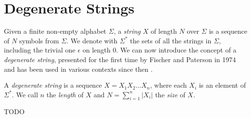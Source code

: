 \section{Degenerate Strings}
Given a finite non-empty alphabet $\Sigma$, a \emph{string} $X$ of length $N$ over $\Sigma$ is a sequence of $N$ symbols from $\Sigma$. We denote with $\Sigma^*$ the sets of all the strings in $\Sigma$, including the trivial one $\epsilon$ on length $0$. We can now introduce the concept of a \emph{degenerate string}, presented for the first time by Fischer and Paterson in 1974 \cite{fischer1974string} and has been used in various contexts since then \cite{alzamel2018degenerate}.

\begin{definition}\label{def:degenerate_string}
    A \emph{degenerate string} is a sequence $X = X_1 X_2 \ldots X_n$, where each $X_i$ is an element of $\Sigma^*$. We call $n$ the \emph{length} of $X$ and $N = \sum_{i=1}^{n} |X_i|$ the \emph{size} of $X$.
\end{definition}

\begin{definition}\label{def:balanced_degenerate_string}
    TODO
\end{definition}


